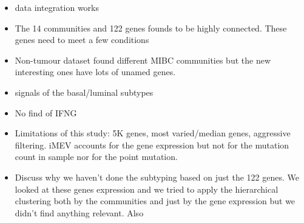 \begin{itemize}
    \item data integration works
    \item The 14 communities and 122 genes founds to be highly connected. These genes need to meet a few conditions
    \item Non-tumour dataset found different MIBC communities but the new interesting ones have lots of unamed genes.
    \item signals of the basal/luminal subtypes
    \item No find of IFNG
    \item Limitations of this study: 5K genes, most varied/median genes, aggressive filtering. iMEV accounts for the gene expression but not for the mutation count in sample nor for the point mutation.
    \item Discuss why we haven't done the subtyping based on just the 122 genes. We looked at these genes expression and we tried to apply the hierarchical clustering both by the communities and just by the gene expression but we didn't find anything relevant. Also
    
\end{itemize}